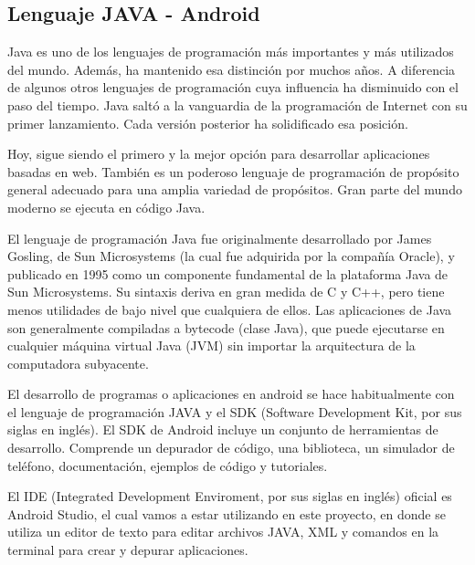 \subsection{Lenguaje JAVA - Android}
	\par 
		Java es uno de los lenguajes de programación más importantes y más utilizados del mundo.
		Además, ha mantenido esa distinción por muchos años. A diferencia de algunos otros
		lenguajes de programación cuya influencia ha disminuido con el paso del tiempo. Java saltó a la vanguardia de la programación de Internet con su primer
		lanzamiento. Cada versión posterior ha solidificado esa posición.
		
\clearpage
\thispagestyle{plain} 

	\par \noindent
		Hoy, sigue siendo el primero
		y la mejor opción para desarrollar aplicaciones basadas en web. También es un poderoso lenguaje de programación de propósito general adecuado para una amplia variedad de propósitos.
		Gran parte del mundo moderno se ejecuta en código Java.
		
	\par \noindent
		El lenguaje de programación Java fue originalmente desarrollado por James Gosling, de Sun Microsystems (la cual fue adquirida por la compañía Oracle), y publicado en 1995 como un componente fundamental de la plataforma Java de Sun Microsystems. Su sintaxis deriva en gran medida de C y C++, pero tiene menos utilidades de bajo nivel que cualquiera de ellos. Las aplicaciones de Java son generalmente compiladas a bytecode (clase Java), que puede ejecutarse en cualquier máquina virtual Java (JVM) sin importar la arquitectura de la computadora subyacente.
		
	\par \noindent
		El desarrollo de programas o aplicaciones en android se hace habitualmente con el lenguaje de programación JAVA y el SDK (Software Development Kit, por sus siglas en inglés). El SDK de Android incluye un conjunto de herramientas de desarrollo. Comprende un depurador de código, una biblioteca, un simulador de teléfono, documentación, ejemplos de código y tutoriales.
		
	\par \noindent
		El IDE (Integrated Development Enviroment, por sus siglas en inglés) oficial es Android Studio, el cual vamos a estar utilizando en este proyecto, en donde se utiliza un editor de texto para editar archivos JAVA, XML y comandos en la terminal para crear y depurar aplicaciones.